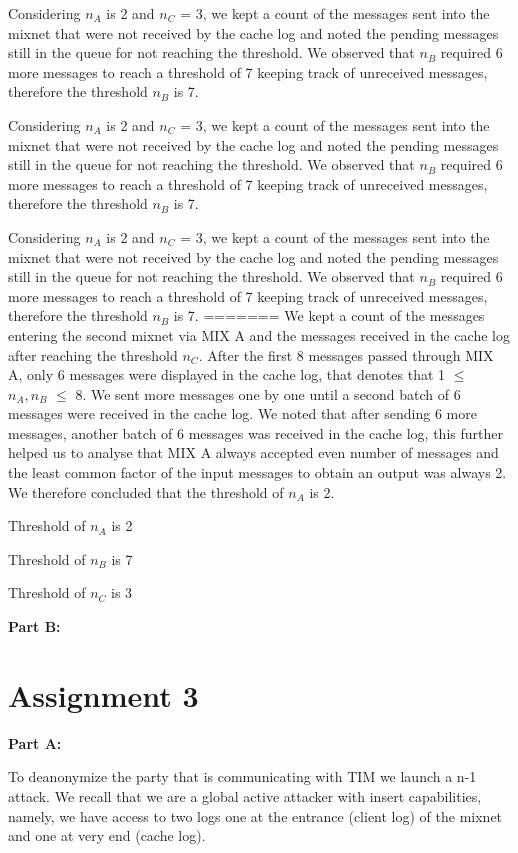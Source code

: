 \documentclass[preprint,12pt,3p]{elsarticle}
\begin{document}
Considering $n_A$ is 2 and $n_C$ = 3, we kept a count of the messages sent into the mixnet that were not received by the cache log and noted the pending messages still in the queue for not reaching the threshold. We observed that $n_B$ required 6 more messages to reach a threshold of 7 keeping  track of unreceived messages, therefore the threshold $n_B$ is 7.

Considering $n_A$ is 2 and $n_C$ = 3, we kept a count of the messages sent into the mixnet that were not received by the cache log and noted the pending messages still in the queue for not reaching the threshold. We observed that $n_B$ required 6 more messages to reach a threshold of 7 keeping  track of unreceived messages, therefore the threshold $n_B$ is 7.

Considering $n_A$ is 2 and $n_C$ = 3, we kept a count of the messages sent into the mixnet that were not received by the cache log and noted the pending messages still in the queue for not reaching the threshold. We observed that $n_B$ required 6 more messages to reach a threshold of 7 keeping  track of unreceived messages, therefore the threshold $n_B$ is 7.
=======
We kept a count of the messages entering the second mixnet via MIX A and the messages received in the cache log after reaching the threshold $n_C$. After the first 8 messages passed through MIX A, only 6 messages were displayed in the cache log, that denotes that 1 $\leq$ $n_A, n_B$ $\leq$ 8. We sent more messages one by one until a second batch of 6 messages were received in the cache log. We noted that after sending 6 more messages, another batch of 6 messages was received in the cache log, this further helped us to analyse that MIX A always accepted even number of messages and the least common factor of the input messages to obtain an output was always 2. We therefore concluded that the threshold of $n_A$ is 2.

\begin{center}
Threshold of $n_A$ is 2

Threshold of $n_B$ is 7

Threshold of $n_C$ is 3
\end{center}




\textbf{Part B:}

\section*{Assignment 3}
\textbf{Part A:}

To deanonymize the party that is communicating with TIM we launch a n-1 attack. We recall that we are a global active attacker with insert capabilities, namely, we have access to two logs one at the entrance (client log) of the mixnet and one at very end (cache log).
\end{document}
